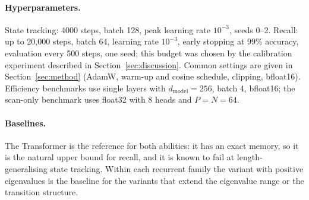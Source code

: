 \begin{table}[htbp]\centering
{}
\caption{Model configurations (two layers, $d_{\text{model}}=128$; state-tracking models include a SwiGLU MLP
with ratio 2, recall models have no MLP). Parameter counts include the embedding.}
\label{tab:models}
\end{table}

\paragraph{Hyperparameters.} State tracking: 4000 steps, batch 128, peak learning rate $10^{-3}$, seeds 0--2.
Recall: up to 20{,}000 steps, batch 64, learning rate $10^{-3}$, early stopping at 99\% accuracy, evaluation
every 500 steps, one seed; this budget was chosen by the calibration experiment described in
Section~\ref{sec:discussion}. Common settings are given in Section~\ref{sec:method} (AdamW, warm-up and cosine
schedule, clipping, bfloat16). Efficiency benchmarks use single layers with $d_{\text{model}}=256$, batch 4,
bfloat16; the scan-only benchmark uses float32 with 8 heads and $P=N=64$.

\paragraph{Baselines.} The Transformer is the reference for both abilities: it has an exact memory, so it is
the natural upper bound for recall, and it is known to fail at length-generalising state tracking. Within
each recurrent family the variant with positive eigenvalues is the baseline for the variants that extend the
eigenvalue range or the transition structure.

